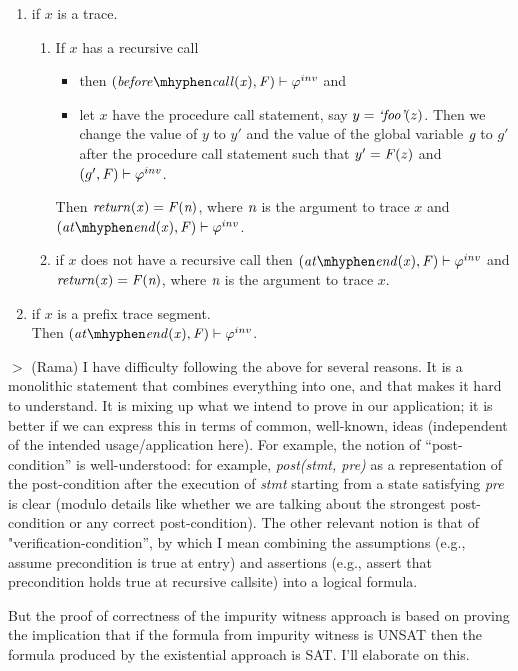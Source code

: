 \begin{enumerate}
\begin{definition}
  \begin{enumerate}
  \item if $x$ is a trace.
    \begin{enumerate}
    \item If $x$ has a recursive call
      \begin{itemize}
      \item then $(\beforeCall{x}, \F) \satisfies \inv$ and
      \item let $x$ have the procedure call statement, say $y =
        \textit{`foo'}(z)$. Then we change the value of $y$ to $y'$ and the
        value of the global variable $\textit{g}$ to $g'$ after the procedure
        call statement such that $y' = \mathit{F}(z)$ and $(g', \mathit{F})
        \vdash \varphi^{inv}$.
      \end{itemize}
      Then $\mathit{return(x)} = \mathit{F}(\textit{n})$, where $\textit{n}$ is the argument to
      trace $x$ and $(\atEnd{x}, \F) \satisfies \inv$.
    \item if $x$ does not have a recursive call
      then $(\atEnd{x}, \F) \satisfies \inv$ and $\mathit{return(x)} =
      \mathit{F}(\textit{n})$, where $\textit{n}$ is the argument to trace $x$.
    \end{enumerate}
  \item if $x$ is a prefix trace segment.\\
    Then $(\atEnd{x}, \F) \satisfies \inv$.
  \end{enumerate}
\end{definition}

$>$ (Rama) I have difficulty following the above for several reasons. It is
a monolithic statement that combines everything into one, and that makes it
hard to understand. It is mixing up what we intend to prove in our application;
it is better if we can express this in terms of common, well-known, ideas
(independent of the intended usage/application here). For example,
the notion of ``post-condition'' is well-understood: for example,
\emph{post(stmt, pre)} as a representation of the post-condition after
the execution of \emph{stmt} starting from a state satisfying \emph{pre}
is clear (modulo details like whether we are talking about the strongest
post-condition or any correct post-condition). The other relevant notion
is that of "verification-condition'', by which I mean combining the
assumptions (e.g., assume precondition is true at entry) and
assertions (e.g., assert that precondition holds true at recursive
callsite) into a logical formula. 

But the proof of correctness of the impurity witness approach is based
on proving the implication that if the formula from impurity witness
is UNSAT then the formula produced by the existential approach is
SAT. I'll elaborate on this.

\end{enumerate}
